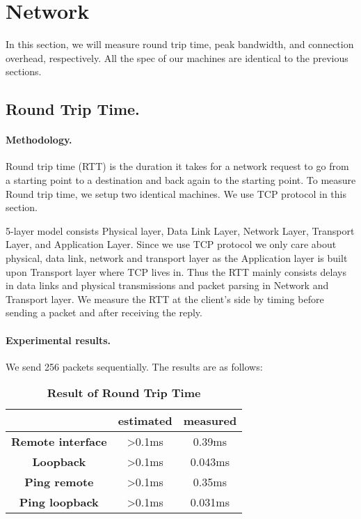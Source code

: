 \section{Network}
\label{sec:network}
In this section, we will measure round trip time, peak bandwidth, and connection overhead, respectively. All the spec of our machines are identical to the previous sections.

\subsection{Round Trip Time.}
\paragraph{Methodology.} Round trip time (RTT) is the duration it takes for a network request to go from a starting point to a destination and back again to the starting point. To measure Round trip time, we setup two identical machines. We use TCP protocol in this section.

5-layer model consists Physical layer, Data Link Layer, Network Layer, Transport Layer, and Application Layer. Since we use TCP protocol we only care about physical, data link, network and transport layer as the Application layer is built upon Transport layer where TCP lives in. Thus the RTT mainly consists delays in data links and physical transmissions and packet parsing in Network and Transport layer. We measure the RTT at the client's side by timing before sending a packet and after receiving the reply.

\paragraph{Experimental results.}
We send 256 packets sequentially. The results are as follows:

\begin{table}[h]
	\centering
	\begin{tabular}{c|c|c}
		\hline
		\makecell{Type} & estimated & measured\\ \hline
        \textbf{Remote interface} & >0.1ms & 0.39ms \\ \hline
        \textbf{Loopback} & >0.1ms & 0.043ms  \\ \hline
		\textbf{Ping remote} & >0.1ms & 0.35ms  \\ \hline
		\textbf{Ping loopback} & >0.1ms & 0.031ms  \\ \hline
	\end{tabular}
	\caption{\textbf{Result of Round Trip Time}}
	\label{table:round-trip}
\end{table}

